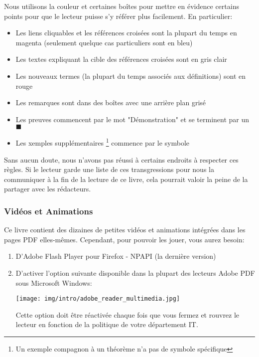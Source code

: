 	Nous utilisons la couleur et certaines boîtes pour mettre en évidence certains points pour que le lecteur puisse s'y référer plus facilement. En particulier:
	\begin{itemize}
		\item Les liens cliquables et les références croisées sont la plupart du temps en magenta (seulement quelque cas particuliers sont en bleu)
	
		\item Les textes expliquant la cible des références croisées sont en gris clair
	
		\item Les nouveaux termes (la plupart du temps associés aux définitions) sont en rouge
	
		\item Les remarques sont dans des boîtes avec une arrière plan grisé
	
		\item Les preuves commencent par le mot "Démonstration" et se terminent par un $\blacksquare$
	
		\item Les xemples supplémentaires \footnote{Un exemple compagnon à un théorème n'a pas de symbole spécifique} commence par le symbole {\Large {}}
	\end{itemize}
	Sans aucun doute, nous n’avons pas réussi à certains endroits à respecter ces règles. Si le lecteur garde une liste de ces transgressions pour nous la communiquer à la fin de la lecture de ce livre, cela pourrait valoir la peine de la partager avec les rédacteurs.
	
	\subsubsection{Vidéos et Animations}
	Ce livre contient des dizaines de petites vidéos et animations intégrées dans les pages PDF elles-mêmes. Cependant, pour pouvoir les jouer, vous aurez besoin:
	\begin{enumerate}
		\item D'Adobe Flash Player pour Firefox - NPAPI (la dernière version)
		
		\item D'activer l'option suivante disponible dans la plupart des lecteurs Adobe PDF sous Microsoft Windows:
		\begin{center}
			\texttt{[image: img/intro/adobe\_reader\_multimedia.jpg]}
		\end{center}
		Cette option doit être réactivée chaque fois que vous fermez et rouvrez le lecteur en fonction de la politique de votre département IT.
	\end{enumerate}
	

